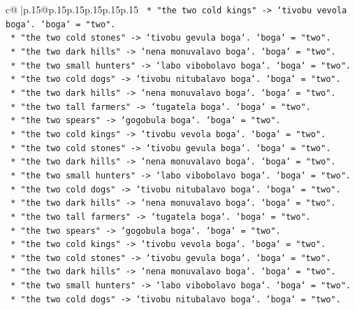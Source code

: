 \documentclass{article}
\begin{document}
{\begin{supertabular}{c@{$\;$}|p{.15\linewidth}@{}p{.15\linewidth}p{.15\linewidth}p{.15\linewidth}p{.15\linewidth}p{.15\linewidth}}
{{{\texttt{        *   "the two cold kings" {-}> `tivobu vevola boga`. `boga` = "two".} \\
\texttt{        *   "the two cold stones" {-}> `tivobu gevula boga`. `boga` = "two".} \\
\texttt{        *   "the two dark hills" {-}> `nena monuvalavo boga`. `boga` = "two".} \\
\texttt{        *   "the two small hunters" {-}> `labo vibobolavo boga`. `boga` = "two".} \\
\texttt{        *   "the two cold dogs" {-}> `tivobu nitubalavo boga`. `boga` = "two".} \\
\texttt{        *   "the two dark hills" {-}> `nena monuvalavo boga`. `boga` = "two".} \\
\texttt{        *   "the two tall farmers" {-}> `tugatela boga`. `boga` = "two".} \\
\texttt{        *   "the two spears" {-}> `gogobula boga`. `boga` = "two".} \\
\texttt{        *   "the two cold kings" {-}> `tivobu vevola boga`. `boga` = "two".} \\
\texttt{        *   "the two cold stones" {-}> `tivobu gevula boga`. `boga` = "two".} \\
\texttt{        *   "the two dark hills" {-}> `nena monuvalavo boga`. `boga` = "two".} \\
\texttt{        *   "the two small hunters" {-}> `labo vibobolavo boga`. `boga` = "two".} \\
\texttt{        *   "the two cold dogs" {-}> `tivobu nitubalavo boga`. `boga` = "two".} \\
\texttt{        *   "the two dark hills" {-}> `nena monuvalavo boga`. `boga` = "two".} \\
\texttt{        *   "the two tall farmers" {-}> `tugatela boga`. `boga` = "two".} \\
\texttt{        *   "the two spears" {-}> `gogobula boga`. `boga` = "two".} \\
\texttt{        *   "the two cold kings" {-}> `tivobu vevola boga`. `boga` = "two".} \\
\texttt{        *   "the two cold stones" {-}> `tivobu gevula boga`. `boga` = "two".} \\
\texttt{        *   "the two dark hills" {-}> `nena monuvalavo boga`. `boga` = "two".} \\
\texttt{        *   "the two small hunters" {-}> `labo vibobolavo boga`. `boga` = "two".} \\
\texttt{        *   "the two cold dogs" {-}> `tivobu nitubalavo boga`. `boga` = "two".} \\
}}}
\end{supertabular}}
\end{document}
